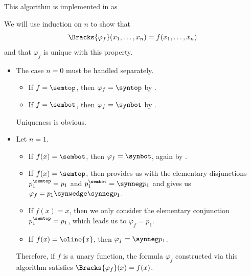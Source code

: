 \begin{comments}
  \item This algorithm is implemented in \cite{notebook:code} as
  \begin{CodeRefDisplay}
  \end{CodeRefDisplay}
\end{comments}
\begin{defproof}
  We will use induction on \( n \) to show that
  \begin{equation*}
    \Bracks{\varphi_f}(x_1, \ldots, x_n) = f(x_1, \ldots, x_n)
  \end{equation*}
  and that \( \varphi_f \) is unique with this property.

  \begin{itemize}
    \item The case \( n = 0 \) must be handled separately.
    \begin{itemize}
      \item If \( f = \semtop \), then \( \varphi_f = \syntop \) by .
      \item If \( f = \sembot \), then \( \varphi_f = \synbot \) by .
    \end{itemize}

    Uniqueness is obvious.

    \item Let \( n = 1 \).
    \begin{itemize}
      \item If \( f(x) = \sembot \), then \( \varphi_f = \synbot \), again by .

      \item If \( f(x) = \semtop \), then  provides us with the elementary disjunctions \( p_1^\semtop = p_1 \) and \( p_1^\sembot = \synneg p_1 \) and  gives us \( \varphi_f = p_1 \synwedge \synneg p_1 \).

      \item If \( f(x) = x \), then we only consider the elementary conjunction \( p_1^\semtop = p_1 \), which leads us to \( \varphi_f = p_1 \).

      \item If \( f(x) = \oline{x} \), then \( \varphi_f = \synneg p_1 \).
    \end{itemize}

    Therefore, if \( f \) is a unary function, the formula \( \varphi_f \) constructed via this algorithm satisfies \( \Bracks{\varphi_f}(x) = f(x) \).


\end{itemize}
\end{defproof}
